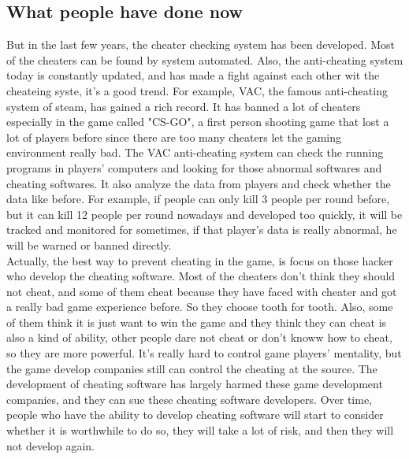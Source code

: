 \documentclass[12pt]{article}
\begin{document}
        \subsection{What people have done now}
            But in the last few years, the cheater checking system has been developed. Most of the cheaters
            can be found by system automated. Also, the anti-cheating system today is constantly updated,
            and has made a fight against each other wit the cheateing syste, it's a good trend. For
            example, VAC, the famous anti-cheating system of steam, has gained a rich record. It has
            banned a lot of cheaters especially in the game called "CS-GO", a first person shooting
            game that lost a lot of players before since there are too many cheaters let the gaming
            environment really bad. The VAC anti-cheating system can check the running programs in
            players' computers and looking for those abnormal softwares and cheating softwares. It
            also analyze the data from players and check whether the data like before. For example,
            if people can only kill 3 people per round before, but it can kill 12 people per round
            nowadays and developed too quickly, it will be tracked and monitored for sometimes, if
            that player's data is really abnormal, he will be warned or banned directly.\\

            Actually, the best way to prevent cheating in the game, is focus on those hacker who
            develop the cheating software. Most of the cheaters don't think they should not cheat,
            and some of them cheat because they have faced with cheater and got a really bad game
            experience before. So they choose tooth for tooth. Also, some of them think it is just
            want to win the game and they think they can cheat is also a kind of ability, other
            people dare not cheat or don't knoww how to cheat, so they are more powerful. It's really
            hard to control game players' mentality, but the game develop companies still can control
            the cheating at the source. The development of cheating software has largely harmed these
            game development companies, and they can sue these cheating software developers. Over
            time, people who have the ability to develop cheating software will start to consider
            whether it is worthwhile to do so, they will take a lot of risk, and then they will not
            develop again.
\end{document}
